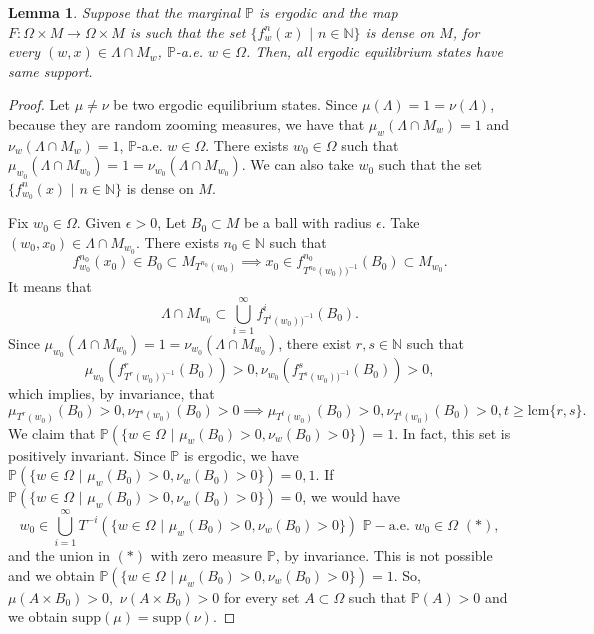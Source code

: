 \documentclass[12pt,a4paper]{amsart}
\theoremstyle{plain}
\newtheorem{lemma}{Lemma}
\begin{document}
	
	\begin{lemma}
		Suppose that the marginal $\mathbb{P}$ is ergodic and the map $F : \Omega \times M \to \Omega \times M$ is such that the set $\{f^{n}_{w}(x) \,\, | \,\, n \in \mathbb{N}\}$ is dense on $M$, for every $(w,x) \in \Lambda \cap M_{w}$,  $\mathbb{P}$-a.e. $w \in \Omega$. Then, all ergodic equilibrium states have same support.
	\end{lemma}
	\begin{proof}
		Let $\mu \neq \nu$ be two ergodic equilibrium states. Since $\mu(\Lambda) = 1 = \nu(\Lambda)$, because they are random zooming measures, we have that $\mu_{w}(\Lambda \cap M_{w})= 1$ and $ \nu_{w}(\Lambda \cap M_{w}) = 1$, $\mathbb{P}$-a.e. $w \in \Omega$. There exists $w_{0} \in \Omega$ such that $\mu_{w_{0}}(\Lambda \cap M_{w_{0}})= 1 = \nu_{w_{0}}(\Lambda \cap M_{w_{0}})$. We can also take $w_{0}$ such that the set $\{f^{n}_{w_{0}}(x) \,\, | \,\, n \in \mathbb{N}\}$ is dense on $M$. 
		
		Fix $w_{0} \in \Omega$. Given $\epsilon > 0$, Let $B_{0} \subset M$ be a ball with radius $\epsilon$. Take $(w_{0}, x_{0}) \in \Lambda \cap M_{w_{0}}$. There exists $n_{0} \in \mathbb{N}$ such that
		\[
		f^{n_{0}}_{w_{0}}(x_{0}) \in B_{0} \subset M_{T^{n_{0}}(w_{0})} \implies x_{0} \in f^{n_{0}}_{T^{n_{0}}(w_{0}))^{-1}}(B_{0}) \subset M_{w_{0}}.	
		\]
		It means that
		\[
		\Lambda \cap M_{w_{0}} \subset \bigcup_{i=1}^{\infty} f^{i}_{T^{i}(w_{0}))^{-1}}(B_{0}).
		\]
		Since $\mu_{w_{0}}(\Lambda \cap M_{w_{0}})= 1 = \nu_{w_{0}}(\Lambda \cap M_{w_{0}})$, there exist $r,s \in \mathbb{N}$ such that
		\[
		\mu_{w_{0}}(f^{r}_{T^{r}(w_{0}))^{-1}}(B_{0}))> 0, \nu_{w_{0}}(f^{s}_{T^{s}(w_{0}))^{-1}}(B_{0}))> 0,
		\]
		which implies, by invariance, that
		\[
		\mu_{T^{r}(w_{0})}(B_{0})> 0, \nu_{T^{s}(w_{0})}(B_{0})> 0 \implies \mu_{T^{t}(w_{0})}(B_{0})> 0, \nu_{T^{t}(w_{0})}(B_{0})> 0, t \geq \text{lcm}\{r,s\}.
		\]
		We claim that  $\mathbb{P}(\{w \in \Omega \,\, | \,\, \mu_{w}(B_{0}) > 0, \nu_{w}(B_{0}) > 0\}) = 1$.  In fact, this set is positively invariant. Since $\mathbb{P}$ is ergodic, we have $\mathbb{P}(\{w \in \Omega \,\, | \,\, \mu_{w}(B_{0}) > 0, \nu_{w}(B_{0}) > 0\}) = 0,1$. If $\mathbb{P}(\{w \in \Omega \,\, | \,\, \mu_{w}(B_{0}) > 0, \nu_{w}(B_{0}) > 0\}) =0$, we would have 
		\[
		w_{0} \in \bigcup_{i=1}^{\infty}T^{-i}(\{w \in \Omega \,\, | \,\, \mu_{w}(B_{0}) > 0, \nu_{w}(B_{0}) > 0\}) \,\, \mathbb{P}-\text{a.e.} \,\, w_{0} \in \Omega \,\, (*),
		\]
		and the union in $(*)$ with zero measure $\mathbb{P}$, by invariance. This is not possible and we obtain $\mathbb{P}(\{w \in \Omega \,\, | \,\, \mu_{w}(B_{0}) > 0, \nu_{w}(B_{0}) > 0\}) = 1$. So, $\mu(A \times B_{0}) > 0, \,\, \nu(A \times B_{0}) > 0$ for every set $A \subset \Omega$ such that $\mathbb{P}(A) > 0$ and we obtain $\text{supp}(\mu) = \text{supp}(\nu)$. 
	\end{proof}
	
\end{document}
